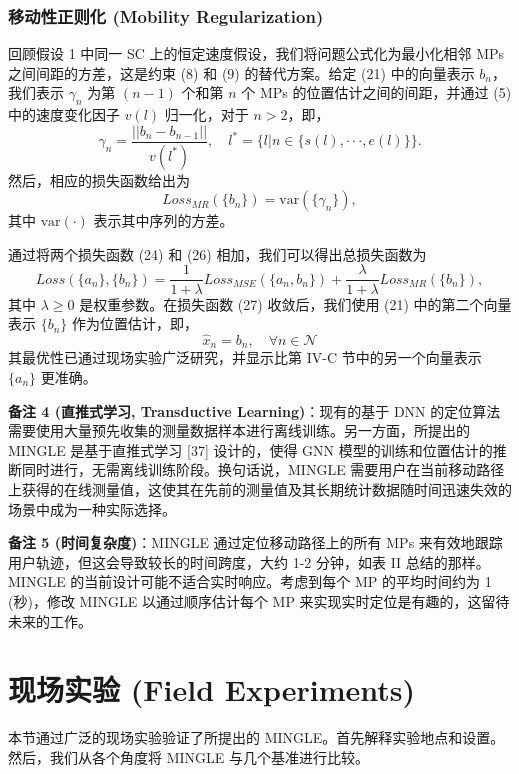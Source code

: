 \documentclass[journal]{IEEEtran}
\begin{document}
\subsubsection{移动性正则化 (Mobility Regularization)}
回顾假设 1 中同一 SC 上的恒定速度假设，我们将问题公式化为最小化相邻 MPs 之间间距的方差，这是约束 (8) 和 (9) 的替代方案。给定 (21) 中的向量表示 $b_{n}$，我们表示 $\gamma_{n}$ 为第 $(n-1)$ 个和第 $n$ 个 MPs 的位置估计之间的间距，并通过 (5) 中的速度变化因子 $v(l)$ 归一化，对于 $n>2$，即，
\begin{equation}
\gamma_{n}=\frac{||b_{n}-b_{n-1}||}{v(l^{*})}, \quad l^{*}=\{l|n\in\{s(l),\cdot\cdot\cdot,e(l)\}\}. \label{eq:25}
\end{equation}
然后，相应的损失函数给出为
\begin{equation}
Loss_{MR}(\{b_{n}\}) = \text{var}(\{\gamma_{n}\}), \label{eq:26}
\end{equation}
其中 $\text{var}(\cdot)$ 表示其中序列的方差。

通过将两个损失函数 (24) 和 (26) 相加，我们可以得出总损失函数为
\begin{equation}
Loss(\{a_{n}\},\{b_{n}\})=\frac{1}{1+\lambda}Loss_{MSE}(\{a_{n},b_{n}\}) +\frac{\lambda}{1+\lambda}Loss_{MR}(\{b_{n}\}), \label{eq:27}
\end{equation}
其中 $\lambda\ge0$ 是权重参数。在损失函数 (27) 收敛后，我们使用 (21) 中的第二个向量表示 $\{b_{n}\}$ 作为位置估计，即，
\begin{equation}
\hat{x}_{n}=b_{n}, \quad \forall n\in\mathcal{N} \label{eq:28}
\end{equation}
其最优性已通过现场实验广泛研究，并显示比第 IV-C 节中的另一个向量表示 $\{a_{n}\}$ 更准确。

\textbf{备注 4 (直推式学习, Transductive Learning)}：现有的基于 DNN 的定位算法需要使用大量预先收集的测量数据样本进行离线训练。另一方面，所提出的 MINGLE 是基于直推式学习 [37] 设计的，使得 GNN 模型的训练和位置估计的推断同时进行，无需离线训练阶段。换句话说，MINGLE 需要用户在当前移动路径上获得的在线测量值，这使其在先前的测量值及其长期统计数据随时间迅速失效的场景中成为一种实际选择。

\textbf{备注 5 (时间复杂度)}：MINGLE 通过定位移动路径上的所有 MPs 来有效地跟踪用户轨迹，但这会导致较长的时间跨度，大约 1-2 分钟，如表 II 总结的那样。MINGLE 的当前设计可能不适合实时响应。考虑到每个 MP 的平均时间约为 1 (秒)，修改 MINGLE 以通过顺序估计每个 MP 来实现实时定位是有趣的，这留待未来的工作。

\section{现场实验 (Field Experiments)}
本节通过广泛的现场实验验证了所提出的 MINGLE。首先解释实验地点和设置。然后，我们从各个角度将 MINGLE 与几个基准进行比较。
\end{document}
